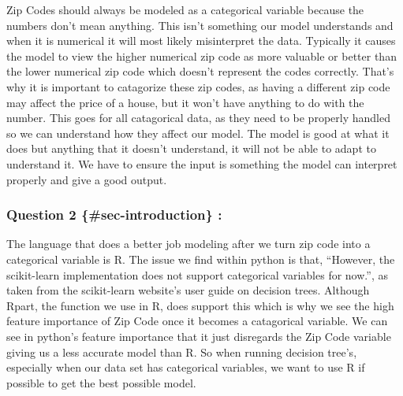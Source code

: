 \documentclass[
  letterpaper,
  DIV=11,
  numbers=noendperiod]{scrartcl}
\begin{document}
\begin{tcolorbox}
Zip Codes should always be modeled as a categorical variable because the
numbers don't mean anything. This isn't something our model understands
and when it is numerical it will most likely misinterpret the data.
Typically it causes the model to view the higher numerical zip code as
more valuable or better than the lower numerical zip code which doesn't
represent the codes correctly. That's why it is important to catagorize
these zip codes, as having a different zip code may affect the price of
a house, but it won't have anything to do with the number. This goes for
all catagorical data, as they need to be properly handled so we can
understand how they affect our model. The model is good at what it does
but anything that it doesn't understand, it will not be able to adapt to
understand it. We have to ensure the input is something the model can
interpret properly and give a good output.

\subsubsection{Question 2 \{\#sec-introduction\}
:}\label{question-2-sec-introduction}

The language that does a better job modeling after we turn zip code into
a categorical variable is R. The issue we find within python is that,
``However, the scikit-learn implementation does not support categorical
variables for now.'', as taken from the scikit-learn website's user
guide on decision trees. Although Rpart, the function we use in R, does
support this which is why we see the high feature importance of Zip Code
once it becomes a catagorical variable. We can see in python's feature
importance that it just disregards the Zip Code variable giving us a
less accurate model than R. So when running decision tree's, especially
when our data set has categorical variables, we want to use R if
possible to get the best possible model.

\end{tcolorbox}
\end{document}
